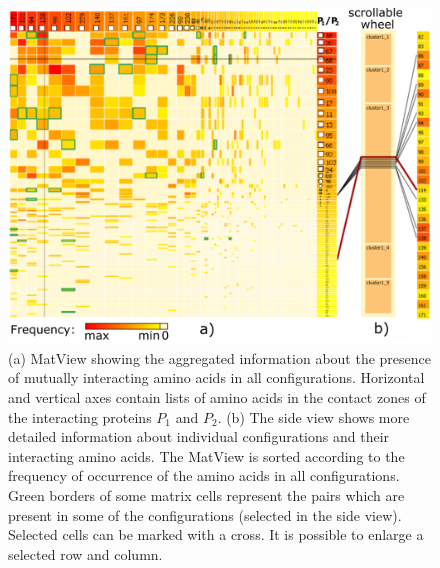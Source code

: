 \documentclass{bmcart}
\begin{document}
\begin{backmatter}
\begin{figure}[h!]
  \centering
  \includegraphics[width=\columnwidth]{images/figure4.pdf}
  \caption{
  (a) MatView showing the aggregated information about the presence of mutually interacting amino acids in all configurations. Horizontal and vertical axes contain lists of amino acids in the contact zones of the interacting proteins $P_1$ and $P_2$. (b) The side view shows more detailed information about individual configurations and their interacting amino acids. The MatView is sorted according to the frequency of occurrence of the amino acids in all configurations. Green borders of some matrix cells represent the pairs which are present in some of the configurations (selected in the side view). Selected cells can be marked with a cross. It is possible to enlarge a selected row and column.}
  \label{fig:matrixlens}
\end{figure}





\end{backmatter}
\end{document}
